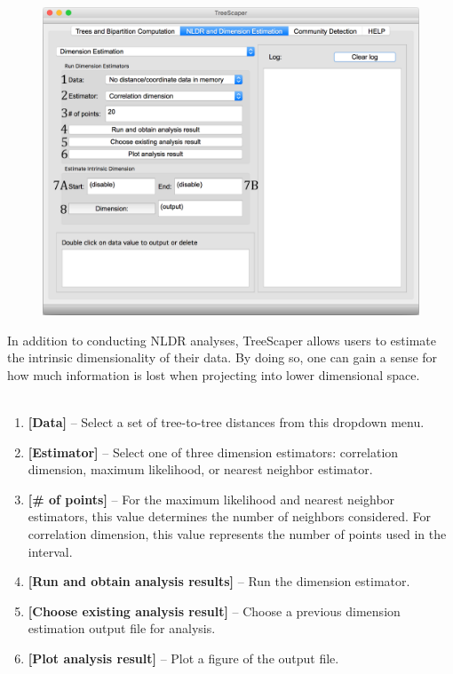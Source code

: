 \documentclass[11pt]{article}
\begin{document}
\begin{figure}[thbp!]\centering
\includegraphics[scale=0.4]{imagesForManual/image_8.png}
\end{figure}

In addition to conducting NLDR analyses, TreeScaper allows users to estimate the intrinsic
dimensionality of their data. By doing so, one can gain a sense for how much information is
lost when projecting into lower dimensional space. \\


\\


\begin{enumerate}[{\bf 1-}]
\item {\bf [Data]} -- Select a set of tree-to-tree distances from this dropdown menu.

\item {\bf [Estimator]} -- Select one of three dimension estimators: correlation dimension, maximum
likelihood, or nearest neighbor estimator.

\item {\bf [\# of points]} -- For the maximum likelihood and nearest neighbor estimators, this value
determines the number of neighbors considered. For correlation dimension, this value
represents the number of points used in the interval.

\item {\bf [Run and obtain analysis results]} -- Run the dimension estimator.

\item {\bf [Choose existing analysis result]} -- Choose a previous dimension estimation output file for
analysis.

\item {\bf [Plot analysis result]} -- Plot a figure of the output file. \\
\end{enumerate}
\end{document}
